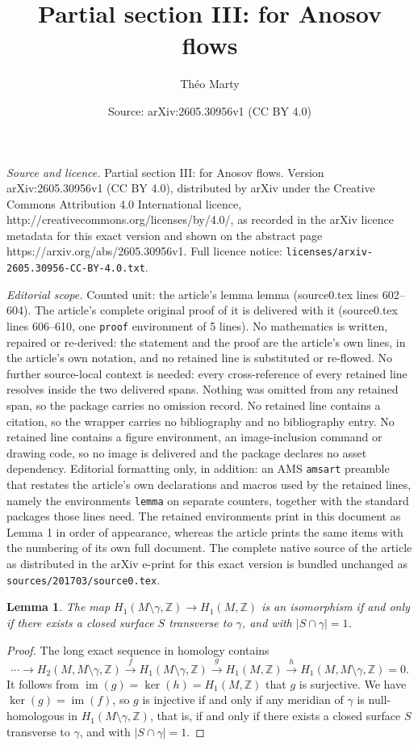 \documentclass[10pt,a4paper]{amsart}
\title{Partial section III: for Anosov flows}
\author{Th\'eo Marty}
\date{Source: arXiv:2605.30956v1 (CC BY 4.0)}
\newtheorem{lemma}{Lemma}
\newcommand{\ZZ}{\mathbb{Z}}
\DeclareMathOperator{\im}{im}
\begin{document}
\maketitle

\noindent\emph{Source and licence.} Partial section III: for Anosov flows. Version arXiv:2605.30956v1 (CC BY 4.0), distributed by arXiv under the Creative Commons Attribution 4.0 International licence, http://creativecommons.org/licenses/by/4.0/, as recorded in the arXiv licence metadata for this exact version and shown on the abstract page https://arxiv.org/abs/2605.30956v1. Full licence notice: \texttt{licenses/arxiv-2605.30956-CC-BY-4.0.txt}.\par\smallskip

\noindent\textit{Editorial scope.} Counted unit: the article's lemma lemma (source0.tex lines 602--604). The article's complete original proof of it is delivered with it (source0.tex lines 606--610, one \texttt{proof} environment of 5 lines). No mathematics is written, repaired or re-derived: the statement and the proof are the article's own lines, in the article's own notation, and no retained line is substituted or re-flowed.  No further source-local context is needed: every cross-reference of every retained line resolves inside the two delivered spans.  Nothing was omitted from any retained span, so the package carries no omission record.  No retained line contains a citation, so the wrapper carries no bibliography and no bibliography entry.  No retained line contains a figure environment, an image-inclusion command or drawing code, so no image is delivered and the package declares no asset dependency.  Editorial formatting only, in addition: an AMS \texttt{amsart} preamble that restates the article's own declarations and macros used by the retained lines, namely the environments \texttt{lemma} on separate counters, together with the standard packages those lines need.  The retained environments print in this document as Lemma 1 in order of appearance, whereas the article prints the same items with the numbering of its own full document.  The complete native source of the article as distributed in the arXiv e-print for this exact version is bundled unchanged as \texttt{sources/201703/source0.tex}.
\begin{lemma}
	The map $H_1(M\setminus\gamma,\ZZ)\to H_1(M,\ZZ)$ is an isomorphism if and only if there exists a closed surface $S$ transverse to $\gamma$, and with $|S\cap\gamma|=1$.
\end{lemma}

\begin{proof}
	The long exact sequence in homology contains
	$$\cdots\to H_2(M,M\setminus\gamma,\ZZ)\xrightarrow{f} H_1(M\setminus\gamma,\ZZ)\xrightarrow{g} H_1(M,\ZZ)\xrightarrow{h} H_1(M,M\setminus\gamma,\ZZ)=0.$$
	It follows from $\im(g)=\ker(h)=H_1(M,\ZZ)$ that $g$ is surjective. We have $\ker(g)=\im(f)$, so $g$ is injective if and only if any meridian of $\gamma$ is null-homologous in $H_1(M\setminus\gamma,\ZZ)$, that is, if and only if there exists a closed surface $S$ transverse to $\gamma$, and with $|S\cap\gamma|=1$.
\end{proof}
\end{document}
